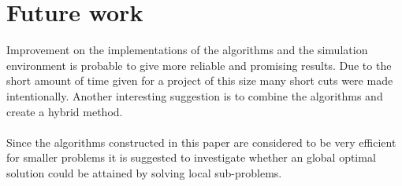 \section{Future work}
Improvement on the implementations of the algorithms and the simulation environment is probable to give more reliable and promising results. Due to the short amount of time given for a project of this size many short cuts were made intentionally. Another interesting suggestion is to combine the algorithms and create a hybrid method. \\
\\Since the algorithms constructed in this paper are considered to be very efficient for smaller problems it is suggested to investigate whether an global optimal solution could be attained by solving local sub-problems.
